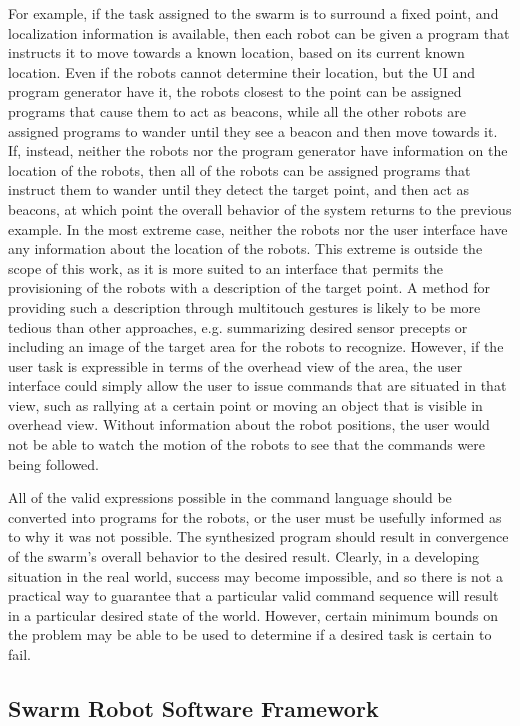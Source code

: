 \documentclass[]{article}
\begin{document}
For example, if the task assigned to the swarm is to surround a fixed point, and localization information is available, then each robot can be given a program that instructs it to move towards a known location, based on its current known location.
Even if the robots cannot determine their location, but the UI and program generator have it, the robots closest to the point can be assigned programs that cause them to act as beacons, while all the other robots are assigned programs to wander until they see a beacon and then move towards it. 
If, instead, neither the robots nor the program generator have information on the location of the robots, then all of the robots can be assigned programs that instruct them to wander until they detect the target point, and then act as beacons, at which point the overall behavior of the system returns to the previous example.
In the most extreme case, neither the robots nor the user interface have any information about the location of the robots. 
This extreme is outside the scope of this work, as it is more suited to an interface that permits the provisioning of the robots with a description of the target point. 
A method for providing such a description through multitouch gestures is likely to be more tedious than other approaches, e.g. summarizing desired sensor precepts or including an image of the target area for the robots to recognize. 
However, if the user task is expressible in terms of the overhead view of the area, the user interface could simply allow the user to issue commands that are situated in that view, such as rallying at a certain point or moving an object that is visible in overhead view. 
Without information about the robot positions, the user would not be able to watch the motion of the robots to see that the commands were being followed. 

All of the valid expressions possible in the command language should be converted into programs for the robots, or the user must be usefully informed as to why it was not possible. 
The synthesized program should result in convergence of the swarm's overall behavior to the desired result. 
Clearly, in a developing situation in the real world, success may become impossible, and so there is not a practical way to guarantee that a particular valid command sequence will result in a particular desired state of the world. 
However, certain minimum bounds on the problem may be able to be used to determine if a desired task is certain to fail. 

\subsection{Swarm Robot Software Framework}
\end{document}

